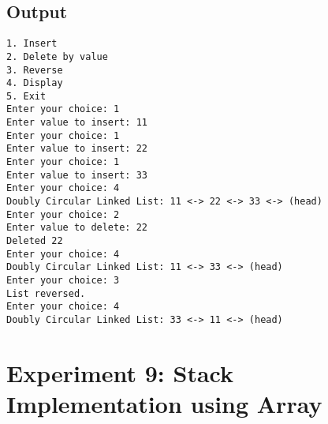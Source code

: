 \documentclass[12pt,a4paper]{article}
\begin{document}
\subsection*{Output}
\begin{tcolorbox}[terminalstyle, title=Sample Output]
\texttt{1. Insert\\2. Delete by value\\3. Reverse\\4. Display\\5. Exit\\
Enter your choice: 1\\
Enter value to insert: 11\\
Enter your choice: 1\\
Enter value to insert: 22\\
Enter your choice: 1\\
Enter value to insert: 33\\
Enter your choice: 4\\
Doubly Circular Linked List: 11 <-> 22 <-> 33 <-> (head)\\
Enter your choice: 2\\
Enter value to delete: 22\\
Deleted 22\\
Enter your choice: 4\\
Doubly Circular Linked List: 11 <-> 33 <-> (head)\\
Enter your choice: 3\\
List reversed.\\
Enter your choice: 4\\
Doubly Circular Linked List: 33 <-> 11 <-> (head)}
\end{tcolorbox}

\newpage
\section*{Experiment 9: Stack Implementation using Array}
\end{document}
